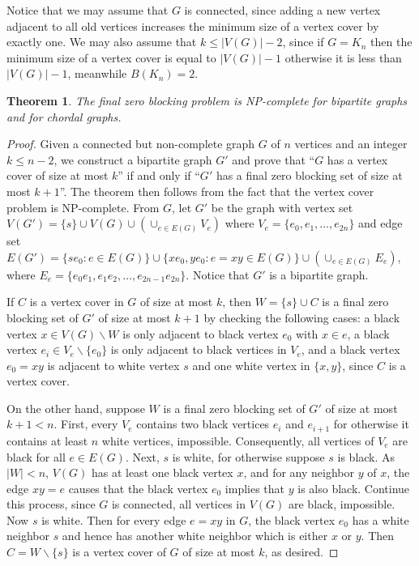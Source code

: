 \documentclass[preprint,12pt]{elsarticle}
\newtheorem{theorem}{Theorem}
\begin{document}
{Notice that we may assume that $G$ is connected, since adding a new vertex adjacent to all old vertices increases the minimum size of a vertex cover by exactly one.
We may also assume that $k\le |V(G)|-2$,
since if $G=K_n$ then the minimum size of a vertex cover is equal to $|V(G)|-1$
otherwise it is less than $|V(G)|-1$,
meanwhile $B(K_n)=2$.

\begin{theorem}
The {final} zero blocking problem is NP-complete for bipartite graphs and for chordal graphs.
\end{theorem}

\begin{proof}
Given a connected but non-complete graph $G$ of $n$ vertices and an integer $k\le n-2$,
we construct a bipartite graph $G'$ and prove that ``$G$ has a vertex cover of size at most $k$''
if and only if ``$G'$ has a {final} zero blocking set of size at most $k+1$''.
The theorem then follows from the fact that the vertex cover problem is NP-complete.
%
From $G$, let $G'$ be the graph with
vertex set $V(G')=\{s\} \cup V(G) \cup (\cup_{e\in E(G)} V_e)$ where
           $V_e=\{e_0, e_1, \ldots,e_{2n}\}$ and
edge set $E(G')=\{s e_0: e\in E(G)\} \cup \{xe_0,ye_0: e=xy\in E(G)\} \cup
           (\cup_{e\in E(G)} E_e)$,
where $E_e=\{e_0 e_1, e_1 e_2, \ldots, e_{2n-1} e_{2n}\}$.
Notice that $G'$ is a bipartite graph.

If $C$ is a vertex cover in $G$ of size at most $k$,
then $W=\{s\}\cup C$ is a {final} zero blocking set of $G'$ of size at most $k+1$
by checking the following cases:
a black vertex $x\in V(G)\backslash W$ is only adjacent to black vertex $e_0$ with $x\in e$,
a black vertex $e_i\in V_e\backslash \{e_0\}$ is only adjacent to black vertices in $V_e$, and a black vertex $e_0=xy$ is adjacent to white vertex $s$ and one white vertex in $\{x,y\}$, since $C$ is a vertex cover.

On the other hand, suppose $W$ is a {final} zero blocking set of $G'$ of size at most $k+1<n$.
First, every $V_e$ contains two black vertices $e_i$ and $e_{i+1}$ for otherwise it contains at least $n$ white vertices, impossible.
Consequently, all vertices of $V_e$ are black for all $e\in E(G)$.
Next, $s$ is white, for otherwise suppose $s$ is black.
As $|W|<n$, $V(G)$ has at least one black vertex $x$,
and for any neighbor $y$ of $x$,
the edge $xy=e$ causes that the black vertex $e_0$ implies that $y$ is also black.
Continue this process, since $G$ is connected, all vertices in $V(G)$ are black, impossible.
Now $s$ is white.
Then for every edge $e=xy$ in $G$, the black vertex $e_0$ has a white neighbor $s$ and hence has another white neighbor which is either $x$ or $y$.
Then $C=W\backslash \{s\}$ is a vertex cover of $G$ of size at most $k$, as desired.


\end{proof}}
\end{document}
